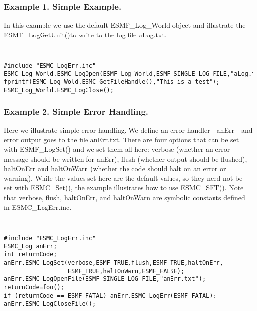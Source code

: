 %


\subsubsection{Example 1. Simple Example.}

In this example we use the default ESMF\_Log\_World object and illustrate
the ESMF\_LogGetUnit()to write to the log file aLog.txt.

{\tt
\begin{verbatim}
#include "ESMC_LogErr.inc"
ESMC_Log_World.ESMC_LogOpen(ESMF_Log_World,ESMF_SINGLE_LOG_FILE,"aLog.txt")
fprintf(ESMC_Log_Wold.ESMC_GetFileHandle(),"This is a test");
ESMC_Log_World.ESMC_LogClose();
\end{verbatim}
\tt}

\subsubsection{Example 2. Simple Error Handling.}

Here we illustrate simple error handling.  We define an error handler - anErr -
and error output goes to the
file anErr.txt.  There are four options that can be set with ESMF\_LogSet()
and we set them all here: verbose (whether an
error message should be written for anErr), flush (whether output should be
flushed), haltOnErr and haltOnWarn (whether the code should halt on
an error or warning).  While the values set here are the default
values, so they need not be set with ESMC\_Set(), the example illustrates how
to use ESMC\_SET().  Note that verbose, flush, haltOnErr, and haltOnWarn are symbolic
constants defined in ESMC\_LogErr.inc.
{\tt
\begin{verbatim}
#include "ESMC_LogErr.inc"
ESMC_Log anErr;
int returnCode;
anErr.ESMC_LogSet(verbose,ESMF_TRUE,flush,ESMF_TRUE,haltOnErr,
                  ESMF_TRUE,haltOnWarn,ESMF_FALSE);
anErr.ESMC_LogOpenFile(ESMF_SINGLE_LOG_FILE,"anErr.txt");
returnCode=foo();
if (returnCode == ESMF_FATAL) anErr.ESMC_LogErr(ESMF_FATAL); 
anErr.ESMC_LogCloseFile();
\end{verbatim}
\tt}

